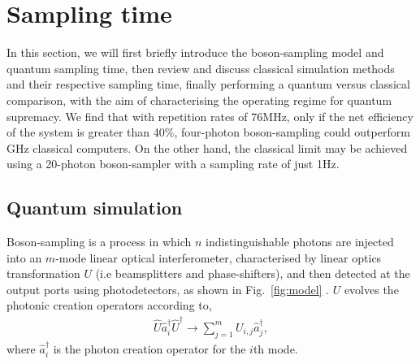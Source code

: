 \documentclass[aps,rmp,twocolumn,amsmath,amssymb,nofootinbib,superscriptaddress]{revtex4}
\begin{document}
\section{Sampling time} \label{sec:sampling_time}

In this section, we will first briefly introduce the boson-sampling model and quantum sampling time, then review and discuss classical simulation methods and their respective sampling time, finally performing a quantum versus classical comparison, with the aim of characterising the operating regime for quantum supremacy. We find that with repetition rates of 76MHz, only if the net efficiency of the system is greater than 40\%, four-photon boson-sampling could outperform GHz classical computers. On the other hand, the classical limit may be achieved using a 20-photon boson-sampler with a sampling rate of just 1Hz.

\subsection{Quantum simulation}

Boson-sampling is a process in which $n$ indistinguishable photons are injected into an $m$-mode linear optical interferometer, characterised by linear optics transformation $U$ (i.e beamsplitters and phase-shifters), and then detected at the output ports using photodetectors, as shown in Fig.~\ref{fig:model} \cite{bib:2}. $U$ evolves the photonic creation operators according to,
\begin{align}
\hat{U} \hat{a}^\dag_i \hat{U}^\dag \to \sum_{j=1}^m U_{i,j} \hat{a}^\dag_j,
\end{align}
where $\hat{a}^\dag_i$ is the photon creation operator for the $i$th mode.
\end{document}
